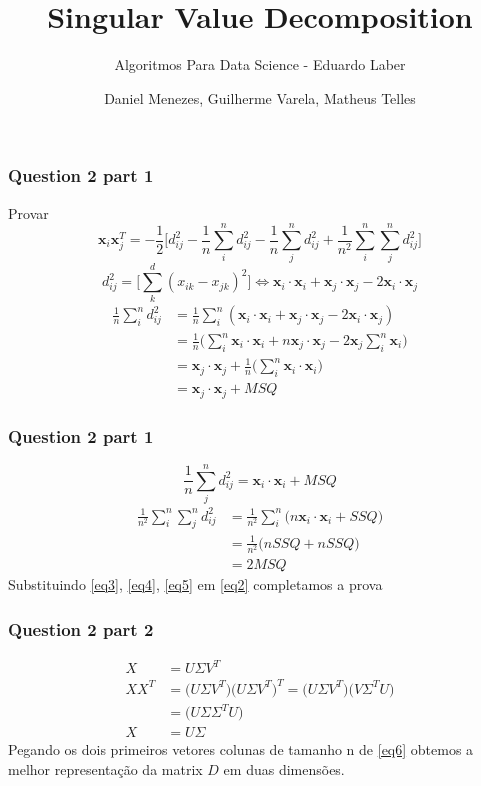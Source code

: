 \documentclass[pdf]{beamer}
\title{Singular Value Decomposition}
\subtitle{Algoritmos Para Data Science - Eduardo Laber}
\author{Daniel Menezes, Guilherme Varela, Matheus Telles}
\begin{document}
	\begin{frame}
		\titlepage
	\end{frame}
	\begin{frame}[t]
		\frametitle{Question 2 part 1}
		Provar
		\begin{equation}\label{eq1}
			\textbf{x}_i\textbf{x}^T_j = -\frac{1}{2}\bigg[ d^2_{ij} - \frac{1}{n}\sum\limits_i^n d^2_{ij} - \frac{1}{n}\sum\limits_j^n d^2_{ij} + \frac{1}{n^2}\sum\limits_i^n \sum\limits_j^n d^2_{ij}\bigg]
		\end{equation} 
		\begin{equation}\label{eq2}
			d^2_{ij} = \bigg[  \sum^d_k \left(x_{ik} - x_{jk} \right)^2\bigg] \Leftrightarrow\textbf{x}_i \cdot\textbf{x}_i + \textbf{x}_j\cdot\textbf{x}_j - 2\textbf{x}_i\cdot\textbf{x}_j
		\end{equation} 
			\begin{align}\label{eq3}
				\frac{1}{n}\sum\limits_i^n d^2_{ij} &= 
				\frac{1}{n}\sum\limits_i^n \left(\textbf{x}_i \cdot\textbf{x}_i + \textbf{x}_j\cdot\textbf{x}_j - 2\textbf{x}_i\cdot\textbf{x}_j\right)\nonumber\\
				&=\frac{1}{n}\Big(\sum\limits_i^n \textbf{x}_i \cdot\textbf{x}_i+ n\textbf{x}_j \cdot\textbf{x}_j
				-2\textbf{x}_j\sum\limits_i^n\textbf{x}_i \Big)\nonumber\\
				&=\textbf{x}_j \cdot\textbf{x}_j + \frac{1}{n}\Big(\sum\limits_i^n \textbf{x}_i \cdot\textbf{x}_i\Big)\nonumber\\
				&=\textbf{x}_j \cdot\textbf{x}_j + MSQ
		\end{align}
	\end{frame}				
	\begin{frame}[t]
		\frametitle{Question 2  part 1}
		\begin{equation}\label{eq4}
			\frac{1}{n}\sum\limits_j^n d^2_{ij} = \textbf{x}_i \cdot\textbf{x}_i + MSQ
		\end{equation} 
		\begin{align}\label{eq5}
		\frac{1}{n^2}\sum\limits_i^n\sum\limits_j^n d^2_{ij} &=  \frac{1}{n^2}\sum\limits_i^n \bigg(n\textbf{x}_i\cdot\textbf{x}_i +  SSQ\bigg)\nonumber\\
		&= \frac{1}{n^2}\bigg( nSSQ+ nSSQ\bigg)\nonumber\\
		&=2MSQ
		\end{align}
		Substituindo \ref{eq3}, \ref{eq4}, \ref{eq5} em \ref{eq2} completamos a prova
	\end{frame}
	\begin{frame}[t]
		\frametitle{Question 2  part 2}
		\begin{align}\label{eq6}
			X &=  U \Sigma V^T\nonumber\\
			XX^T &=  \big(U \Sigma V^T\big)\big( U \Sigma V^T\big)^T = \big(U \Sigma V^T\big)\big( V \Sigma^T U\big)\nonumber\\
					 &=  \big(U \Sigma \Sigma^T U\big)\nonumber\\
				X   &= U \Sigma
		\end{align}
		Pegando os dois primeiros vetores colunas de tamanho n de \ref{eq6} obtemos a melhor representação da matrix $D$ em duas dimensões.
	\end{frame}
\end{document}
